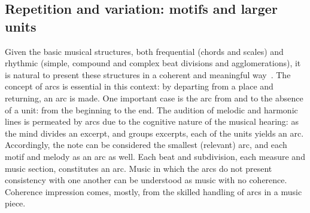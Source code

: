 \subsection{Repetition and variation: motifs and larger units}\label{subsec:motivos}
Given the basic musical structures, both frequential (chords and scales) and rhythmic (simple, compound and complex beat divisions and agglomerations), it is
natural to present these structures in a coherent and meaningful way~\cite{Boulez}. The concept of arcs is essential in this context: by departing from a place and returning, an arc is made. One important case is the arc from and to the absence of a unit: from the beginning to the end. The audition of melodic and harmonic lines is permeated by
arcs due to the cognitive nature of the musical hearing: as the mind divides an excerpt, and groups excerpts, each of the units yields an arc.
Accordingly, the note can be considered the smallest (relevant) arc, and each motif and melody as an arc as well.
Each beat and subdivision, each measure and music
section, constitutes an arc. Music in which the arcs do not present consistency with one another can be understood as music with no coherence. Coherence impression
comes, mostly, from the skilled handling of arcs in a music piece.

